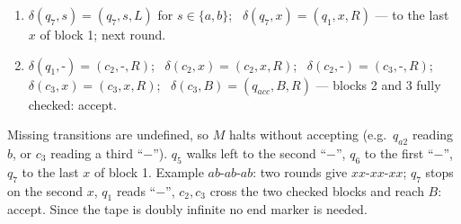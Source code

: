 \documentclass[11pt,a4paper]{article}
\begin{document}
\begin{solution}
{\begin{enumerate}[label=\arabic*.,itemsep=0pt]
\item $\delta(q_7,s)=(q_7,s,L)$ for $s\in\{a,b\}$; \ $\delta(q_7,x)=(q_1,x,R)$ --- to the last $x$ of block 1; next round.
\item $\delta(q_1,\text{-})=(c_2,\text{-},R)$; \ $\delta(c_2,x)=(c_2,x,R)$; \ $\delta(c_2,\text{-})=(c_3,\text{-},R)$; \ $\delta(c_3,x)=(c_3,x,R)$; \ $\delta(c_3,B)=(q_{acc},B,R)$ --- blocks 2 and 3 fully checked: accept.
\end{enumerate}}
Missing transitions are undefined, so $M$ halts without accepting (e.g.\ $q_{a2}$ reading $b$, or $c_3$ reading a third ``$-$''). $q_5$ walks left to the second ``$-$'', $q_6$ to the first ``$-$'', $q_7$ to the last $x$ of block 1. Example $ab\text{-}ab\text{-}ab$: two rounds give $xx\text{-}xx\text{-}xx$; $q_7$ stops on the second $x$, $q_1$ reads ``$-$'', $c_2,c_3$ cross the two checked blocks and reach $B$: accept. Since the tape is doubly infinite no end marker is needed.
\end{solution}
\end{document}
